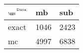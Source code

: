 \begin{tabular}{lll}
    \toprule
    $_{\text{\tiny{\ggn}}}$$^{\text{\tiny{Data}}}$ & mb & sub \\
    \midrule
    exact & 1046
              & 2423 \\
    mc   & 4997
              & 6838 \\
    \bottomrule
\end{tabular}